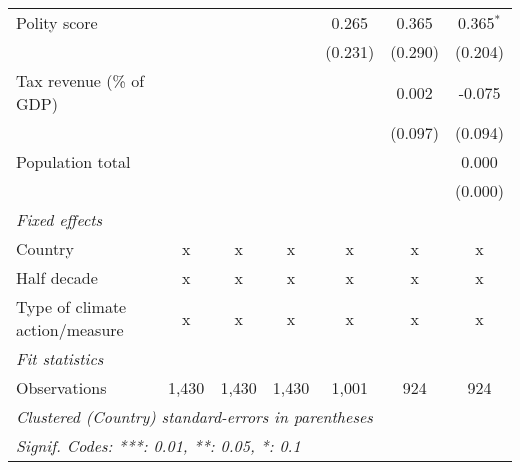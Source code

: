 \begin{tabular}{lcccccc}
   Polity score                                                  &                &                &                & 0.265          & 0.365         & 0.365$^{*}$\\   
                                                                 &                &                &                & (0.231)        & (0.290)       & (0.204)\\   
   Tax revenue (\% of GDP)                                       &                &                &                &                & 0.002         & -0.075\\   
                                                                 &                &                &                &                & (0.097)       & (0.094)\\   
   Population total                                              &                &                &                &                &               & 0.000\\   
                                                                 &                &                &                &                &               & (0.000)\\   
   \emph{Fixed effects}\\
   Country                                                       & x              & x              & x              & x              & x             & x\\  
   Half decade                                                   & x              & x              & x              & x              & x             & x\\  
   Type of climate action/measure                                & x              & x              & x              & x              & x             & x\\  
   \midrule \emph{Fit statistics}\\
   Observations                                                  & 1,430          & 1,430          & 1,430          & 1,001          & 924           & 924\\  
   \midrule
   \multicolumn{7}{l}{\emph{Clustered (Country) standard-errors in parentheses}}\\
   \multicolumn{7}{l}{\emph{Signif. Codes: ***: 0.01, **: 0.05, *: 0.1}}\\
\end{tabular}
\par\endgroup


